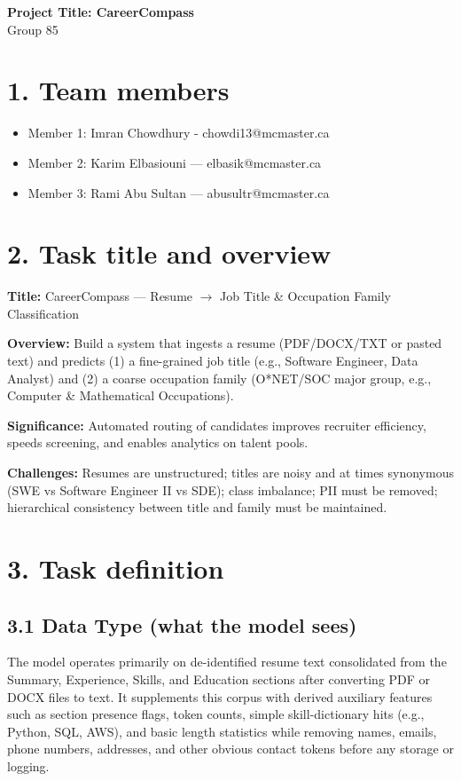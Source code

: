 \documentclass[12pt]{article}
\begin{document}
\begin{center}
  {\Large\bfseries Project Title: CareerCompass}\\[8pt]
  {\normalsize Group 85}
\end{center}

\section*{1. Team members}
\begin{itemize}
  \item Member 1: Imran Chowdhury - chowdi13@mcmaster.ca
  \item Member 2: Karim Elbasiouni — elbasik@mcmaster.ca
  \item Member 3: Rami Abu Sultan — abusultr@mcmaster.ca
\end{itemize}

\section*{2. Task title and overview}
\noindent\textbf{Title:} CareerCompass — Resume $\rightarrow$ Job Title \& Occupation Family Classification

\noindent\textbf{Overview:} Build a system that ingests a resume (PDF/DOCX/TXT or pasted text) and predicts (1) a fine-grained job title (e.g., Software Engineer, Data Analyst) and (2) a coarse occupation family (O*NET/SOC major group, e.g., Computer \& Mathematical Occupations).

\noindent\textbf{Significance:} Automated routing of candidates improves recruiter efficiency, speeds screening, and enables analytics on talent pools. 

\noindent\textbf{Challenges:} Resumes are unstructured; titles are noisy and at times synonymous (SWE vs Software Engineer II vs SDE); class imbalance; PII must be removed; hierarchical consistency between title and family must be maintained.

\setlength{\parindent}{0pt}

\section*{3. Task definition}
\subsection*{3.1 Data Type (what the model sees)}
The model operates primarily on de-identified resume text consolidated from the Summary, Experience, Skills, and Education sections after converting PDF or DOCX files to text. It supplements this corpus with derived auxiliary features such as section presence flags, token counts, simple skill-dictionary hits (e.g., Python, SQL, AWS), and basic length statistics while removing names, emails, phone numbers, addresses, and other obvious contact tokens before any storage or logging.
\end{document}
